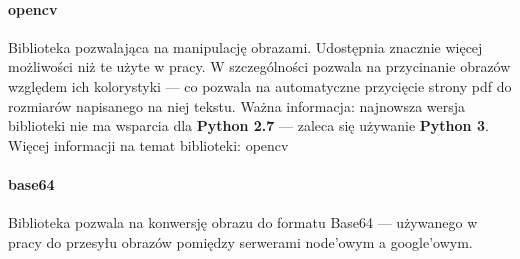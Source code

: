 \paragraph{opencv} Biblioteka pozwalająca na manipulację obrazami. Udostępnia znacznie więcej możliwości niż te użyte w pracy. W szczególności pozwala na przycinanie obrazów względem ich kolorystyki --- co pozwala na automatyczne przycięcie strony pdf do rozmiarów napisanego na niej tekstu. Ważna informacja: najnowsza wersja biblioteki nie ma wsparcia dla \textbf{Python 2.7} --- zaleca się używanie \textbf{Python 3}. Więcej informacji na temat biblioteki: opencv \cite{opencv}
\paragraph{base64} Biblioteka pozwala na konwersję obrazu do formatu Base64 --- używanego w pracy do przesyłu obrazów pomiędzy serwerami node'owym a google'owym. 




